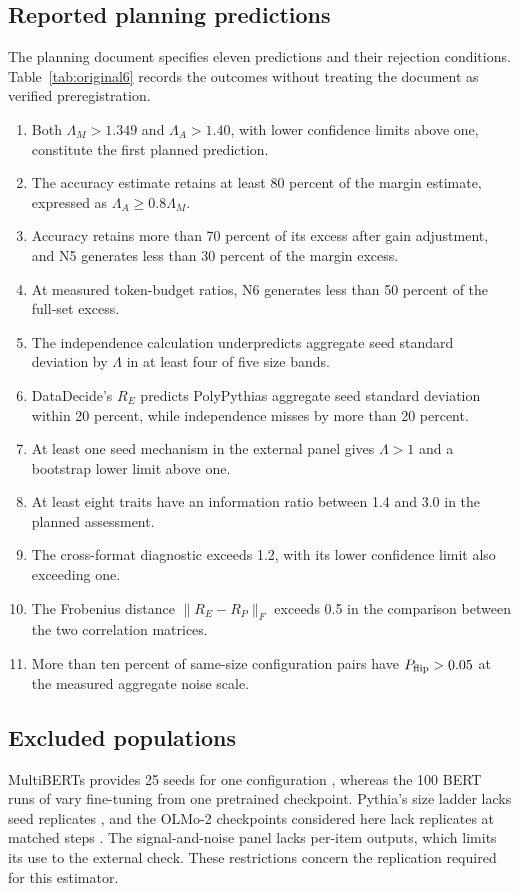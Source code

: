 \subsection{Reported planning predictions}
The planning document specifies eleven predictions and their rejection conditions. Table~\ref{tab:original6} records the outcomes without treating the document as verified preregistration.
\begin{enumerate}
\item Both $\Lambda_M>1.349$ and $\Lambda_A>1.40$, with lower confidence limits above one, constitute the first planned prediction.
\item The accuracy estimate retains at least 80 percent of the margin estimate, expressed as $\Lambda_A\geq0.8\Lambda_M$.
\item Accuracy retains more than 70 percent of its excess after gain adjustment, and N5 generates less than 30 percent of the margin excess.
\item At measured token-budget ratios, N6 generates less than 50 percent of the full-set excess.
\item The independence calculation underpredicts aggregate seed standard deviation by $\Lambda$ in at least four of five size bands.
\item DataDecide's $R_E$ predicts PolyPythias aggregate seed standard deviation within 20 percent, while independence misses by more than 20 percent.
\item At least one seed mechanism in the external panel gives $\Lambda>1$ and a bootstrap lower limit above one.
\item At least eight traits have an information ratio between 1.4 and 3.0 in the planned assessment.
\item The cross-format diagnostic exceeds 1.2, with its lower confidence limit also exceeding one.
\item The Frobenius distance $\|R_E-R_P\|_F$ exceeds 0.5 in the comparison between the two correlation matrices.
\item More than ten percent of same-size configuration pairs have $P_{\rm flip}>0.05$ at the measured aggregate noise scale.
\end{enumerate}

\subsection{Excluded populations}
MultiBERTs provides 25 seeds for one configuration \citep{sellam2022}, whereas the 100 BERT runs of \citet{mccoy2020} vary fine-tuning from one pretrained checkpoint. Pythia's size ladder lacks seed replicates \citep{biderman2023}, and the OLMo-2 checkpoints considered here lack replicates at matched steps \citep{teamolmo2025}. The signal-and-noise panel lacks per-item outputs, which limits its use to the external check. These restrictions concern the replication required for this estimator.

